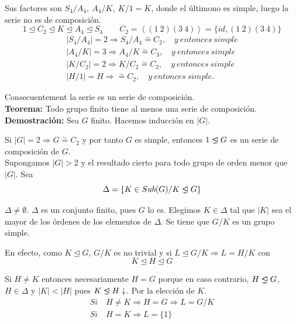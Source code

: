 \documentclass{article}
\newcommand{\unlhdneq}{%
  \mathrel{\ooalign{$\lneq$\cr\raise.22ex\hbox{$\lhd$}\cr}}}
\begin{document}
Sus factores son $S_4/A_4,\:A_4/K,\:K/1=K$, donde el últimono es simple, luego la serie no es de composición. 
\begin{equation*}
1\unlhd C_2\unlhd K\unlhd A_4\unlhd S_4 \qquad C_2=\left\langle(1\:2)(3\:4)\right\rangle=\{id,(1\:2)(3\:4)\}
\end{equation*}
\begin{gather*}
|S_4/A_4|=2\Rightarrow S_4/A_4\overset{\sim}{=} C_2,\quad y\:entonces\:simple \\
|A_4/K|=3\Rightarrow A_4/K\overset{\sim}{=} C_3,\quad y\:entonces\:simple\\
|K/C_2|=2\Rightarrow K/C_2\overset{\sim}{=} C_2,\quad y\:entonces\:simple\\
|H/1|=H\Rightarrow \overset{\sim}{=} C_2,\quad y\:entonces\:simple.
\end{gather*}

Consecuentement la serie es un serie de composición. \\

\textbf{Teorema:} Todo grupo finito tiene al menos una serie de composición. \\

\textbf{Demostración:} Sea $G$ finito. Hacemos inducción en $|G|$. 

Si $|G|=2\Rightarrow G\overset{\sim}{=} C_2$ y por tanto $G$ es simple, entonces $1\unlhdneq G$ es un serie de composición de $G$. \\

Supongamos $|G|>2$ y el resultado cierto para todo grupo de orden menor que $|G|$. Sea
\begin{equation*}
\Delta=\{K\in Sub(G)/K\unlhdneq G\}
\end{equation*}

$\Delta\neq \emptyset$. $\Delta$ es un conjunto finito, pues $G$ lo es. Elegimos $K\in \Delta$ tal que $|K|$ sea el mayor de los órdenes de los elementos de $\Delta$. Se tiene que $G/K$ es un grupo simple. 

En efecto, como $K\unlhd G$, $G/K$ es no trivial y si $L\unlhd G/K\Rightarrow L=H/K$ con 
\begin{equation*}
K\unlhd H\unlhd G
\end{equation*}

Si $H\neq K$ entonces necesariamente $H=G$ porque en caso contrario, $H\unlhdneq G$, $H\in\Delta$ y $|K|<|H|$ pues $K\unlhdneq H \downarrow$. Por la elección de $K$.  
\begin{gather*}
Si\quad H\neq K\Rightarrow H=G\Rightarrow L=G/K\\
Si\quad H=K\Rightarrow L=\{1\}
\end{gather*}
\end{document}
